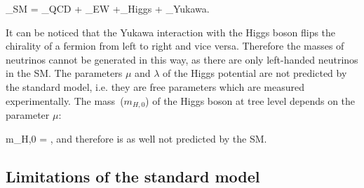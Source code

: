 {
 _{SM} = _{QCD} + _{EW} +_{Higgs} + _{Yukawa}.
} 

It can be noticed  that the Yukawa interaction with the Higgs boson flips the chirality of a fermion from left to right and vice versa. Therefore the masses of neutrinos cannot be generated in this way, as there are only left-handed neutrinos in the SM. The parameters $\mu$ and $\lambda$ of the Higgs potential are not predicted by the standard model, i.e. they are free parameters which are measured experimentally. The mass~($m_{H,0}$) of the Higgs boson at tree level depends on the parameter $\mu$: 

{
m_{H,0} = \mu,
}
and therefore is as well not predicted by the SM. 


\subsection{Limitations of the standard model~\label{sec:shortcomings}}

